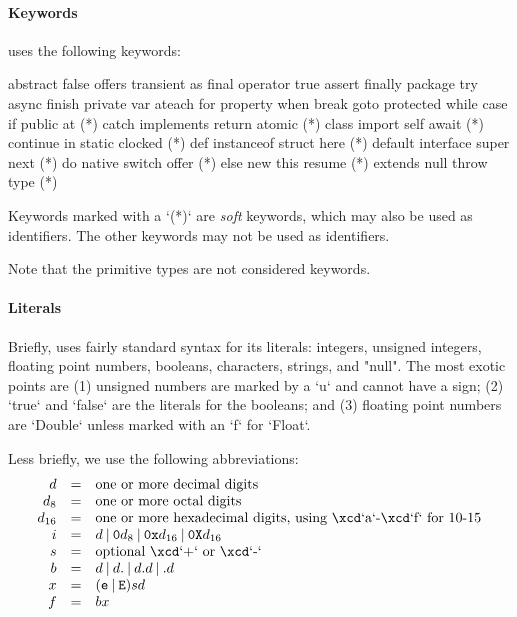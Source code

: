 \paragraph{Keywords}
\Xten{} uses the following keywords:
\begin{xten}
abstract       false          offers         transient      
as             final          operator       true           
assert         finally        package        try            
async          finish         private        var            
ateach         for            property       when           
break          goto           protected      while          
case           if             public         at (*)         
catch          implements     return         atomic (*)     
class          import         self           await (*)      
continue       in             static         clocked (*)    
def            instanceof     struct         here (*)       
default        interface      super          next (*)       
do             native         switch         offer (*)      
else           new            this           resume (*)     
extends        null           throw          type (*)       
\end{xten}
Keywords marked with a \xcd`(*)` are {\em soft} keywords, which may also be
used as identifiers.  The other keywords may not be used as identifiers.

Note that the primitive types are not considered keywords.

\paragraph{Literals}\label{Literals}

Briefly, \XtenCurrVer{} uses fairly standard syntax for its literals:
integers, unsigned integers, floating point numbers, booleans, 
characters, strings, and \xcd"null".  The most exotic points are (1) unsigned
numbers are marked by a \xcd`u` and cannot have a sign; (2) \xcd`true` and
\xcd`false` are the literals for the booleans; and (3) floating point numbers
are \xcd`Double` unless marked with an \xcd`f` for \xcd`Float`. 

Less briefly, we use the following abbreviations: 
\begin{displaymath}
\begin{array}{rcll}
d &=& \mbox{one or more decimal digits}\\
d_8 &=& \mbox{one or more octal digits}\\
d_{16} &=& \mbox{one or more hexadecimal digits, using \xcd`a`-\xcd`f`
for 10-15}\\
i &=& d 
        \mathbin{|} {\tt 0} d_8 
        \mathbin{|} {\tt 0x} d_{16}
        \mathbin{|} {\tt 0X} d_{16}
\\
s &=& \mbox{optional \xcd`+` or \xcd`-`}\\
b &=& d 
          \mathbin{|} d {\tt .}
          \mathbin{|} d {\tt .} d
          \mathbin{|}  {\tt .} d \\
x &=& ({\tt e } \mathbin{|} {\tt E})
         s
         d \\
f &=& b x
\end{array}
\end{displaymath}

